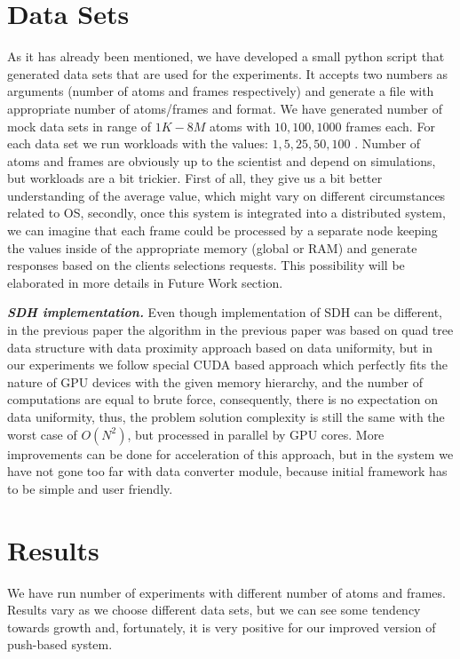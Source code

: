 \documentclass[12pt,letterpaper]{report}
\begin{document}
\section{Data Sets}

\hspace{3em} As it has already been mentioned, we have developed a small python script that generated data sets that are used for the experiments. It accepts two numbers as arguments (number of atoms and frames respectively) and generate a file with appropriate number of atoms/frames and format. We have generated number of mock data sets in range of $1K-8M$ atoms with $10, 100, 1000$ frames each. For each data set we run workloads with the values: $1, 5, 25, 50, 100$ . Number of atoms and frames are obviously up to the scientist and depend on simulations, but workloads are a bit trickier. First of all, they give us a bit better understanding of the average value, which might vary on different circumstances related to OS, secondly, once this system is integrated into a distributed system, we can imagine that each frame could be processed by a separate node keeping the values inside of the appropriate memory (global or RAM) and generate responses based on the clients selections requests. This possibility will be elaborated in more details in Future Work section.



\emph{\textbf{SDH implementation.}} Even though implementation of SDH can be different, in the previous paper the algorithm in the previous paper was based on quad tree data structure with data proximity approach based on data uniformity\cite{mainPaper}, but in our experiments we follow special CUDA based approach which perfectly fits the nature of GPU devices with the given memory hierarchy, and the number of computations are equal to brute force, consequently, there is no expectation on data uniformity, thus, the problem solution complexity is still the same with the worst case of $O(N^2)$, but processed in parallel by GPU cores. More improvements can be done for acceleration of this approach, but in the system we have not gone too far with data converter module, because initial framework has to be simple and user friendly.

\section{Results}

\hspace{3em} We have run number of experiments with different number of atoms and frames. Results vary as we choose different data sets, but we can see some tendency towards growth and, fortunately, it is very positive for our improved version of push-based system.
\end{document}
